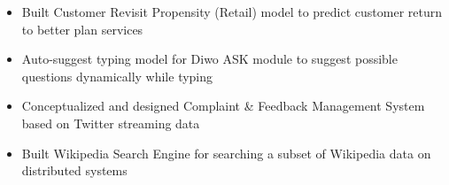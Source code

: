\documentclass[a4paper,10pt]{article}
\newcommand{\lsep}{-0.5cm}
\newcommand{\resheading}[1]{{\small
        {
            \begin{minipage}
                {0.992\textwidth}\textbf{{\textsc{#1 \vphantom{p\^{E}} }}}
                \\[-0.3cm]
                \hrule
            \end{minipage}
            \\[-0.5cm]
        }
 }}
\begin{document}
\begin{itemize}
\item Built Customer Revisit Propensity (Retail) model to predict customer return to better plan services 
\\ [-0.5cm]

\item Auto-suggest typing model for Diwo ASK module to suggest possible questions dynamically while typing 
\\ [-0.5cm]

\item Conceptualized and designed Complaint \& Feedback Management System based on Twitter streaming data
\\ [-0.5cm]

\item Built Wikipedia Search Engine for searching a subset of Wikipedia data on distributed systems 

\end{itemize}


\end{document}
